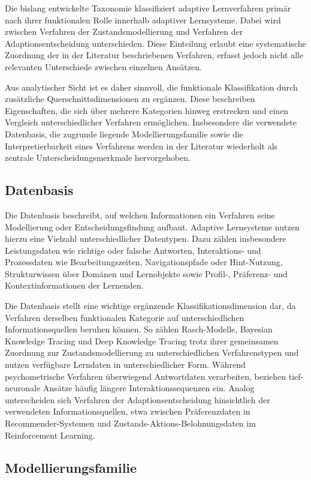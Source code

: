Die bislang entwickelte Taxonomie klassifiziert adaptive Lernverfahren
primär nach ihrer funktionalen Rolle innerhalb adaptiver Lernsysteme.
Dabei wird zwischen Verfahren der Zustandsmodellierung und Verfahren der
Adaptionsentscheidung unterschieden. Diese Einteilung erlaubt eine
systematische Zuordnung der in der Literatur beschriebenen Verfahren,
erfasst jedoch nicht alle relevanten Unterschiede zwischen einzelnen
Ansätzen.

Aus analytischer Sicht ist es daher sinnvoll, die funktionale
Klassifikation durch zusätzliche Querschnittsdimensionen zu ergänzen.
Diese beschreiben Eigenschaften, die sich über mehrere Kategorien hinweg
erstrecken und einen Vergleich unterschiedlicher Verfahren ermöglichen.
Insbesondere die verwendete Datenbasis, die zugrunde liegende
Modellierungsfamilie sowie die Interpretierbarkeit eines Verfahrens
werden in der Literatur wiederholt als zentrale Unterscheidungsmerkmale
hervorgehoben.

\subsection{Datenbasis}\label{datenbasis}

Die Datenbasis beschreibt, auf welchen Informationen ein Verfahren seine
Modellierung oder Entscheidungsfindung aufbaut. Adaptive Lernsysteme
nutzen hierzu eine Vielzahl unterschiedlicher Datentypen. Dazu zählen
insbesondere Leistungsdaten wie richtige oder falsche Antworten,
Interaktions- und Prozessdaten wie Bearbeitungszeiten, Navigationspfade
oder Hint-Nutzung, Strukturwissen über Domänen und Lernobjekte sowie
Profil-, Präferenz- und Kontextinformationen der Lernenden.

Die Datenbasis stellt eine wichtige ergänzende Klassifikationsdimension
dar, da Verfahren derselben funktionalen Kategorie auf unterschiedlichen
Informationsquellen beruhen können. So zählen Rasch-Modelle, Bayesian
Knowledge Tracing und Deep Knowledge Tracing trotz ihrer gemeinsamen
Zuordnung zur Zustandsmodellierung zu unterschiedlichen Verfahrenstypen
und nutzen verfügbare Lerndaten in unterschiedlicher Form. Während
psychometrische Verfahren überwiegend Antwortdaten verarbeiten, beziehen
tief-neuronale Ansätze häufig längere Interaktionssequenzen ein. Analog
unterscheiden sich Verfahren der Adaptionsentscheidung hinsichtlich der
verwendeten Informationsquellen, etwa zwischen Präferenzdaten in
Recommender-Systemen und Zustands-Aktions-Belohnungsdaten im
Reinforcement Learning.

\subsection{Modellierungsfamilie}\label{modellierungsfamilie}

